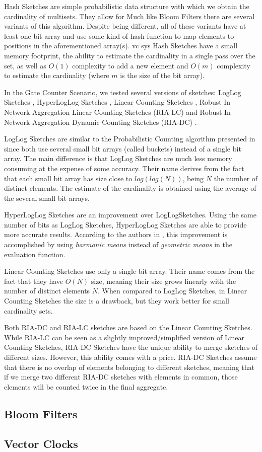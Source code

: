 Hash Sketches are simple probabilistic data structure with which we 
obtain the cardinality of multisets. They allow for 
Much like Bloom Filters there are several variants of this algorithm.
Despite being different, all of these variants have at least one bit array
and use some kind of hash function to map elements to positions in the
aforementioned array(s).
vc sys
Hash Sketches have a small memory footprint, the ability to estimate the
cardinality in a single pass over the set, as well as $O(1)$ complexity to
add a new element and $O(m)$ complexity to estimate the cardinality (where
$m$ is the size of the bit array).

In the Gate Counter Scenario, we tested several versions of sketches: LogLog
Sketches \cite{Durand:2003tc}, HyperLogLog Sketches \cite{Fusy:2007um}, Linear
Counting Sketches \cite{Whang:1990uh}, Robust In Network Aggregation Linear
Counting Sketches (RIA-LC) \cite{Fan:2008wl,YaoChungFanArbeeLPChen:2010to} and
Robust In Network Aggregation Dynamic Counting Sketches (RIA-DC)
\cite{YaoChungFanArbeeLPChen:2010to}.

LogLog Sketches are similar to the Probabilistic Counting algorithm
presented in \cite{Flajolet:1985wd} since both use several small bit arrays
(called buckets) instead of a single bit array. The main difference is that
LogLog Sketches are much less memory consuming at the expense of some
accuracy. Their name derives from the fact that each small bit array has
size close to $log(log(N))$, being $N$ the number of distinct elements. The
estimate of the cardinality is obtained using the average of the several
small bit arrays.

HyperLogLog Sketches are an improvement over LogLogSketches. Using the same
number of bits as LogLog Sketches, HyperLogLog Sketches are able to provide more
accurate results. According to the authors in \cite{Fusy:2007um}, this
improvement is accomplished by using \emph{harmonic means} instead of
\emph{geometric means} in the evaluation function.

Linear Counting Sketches use only a single bit array. Their name comes from the
fact that they have $O(N)$ size, meaning their size grows linearly with the
number of distinct elements $N$. When compared to LogLog Sketches, in Linear
Counting Sketches the size is a drawback, but they work better for small
cardinality sets.

Both RIA-DC and RIA-LC sketches are based on the Linear Counting
Sketches. While RIA-LC can be seen as a slightly improved/simplified version of
Linear Counting Sketches, RIA-DC Sketches have the unique ability to
merge sketches of different sizes. However, this ability comes with a
price. RIA-DC Sketches assume that there is no overlap of elements belonging to
different sketches, meaning that if we merge two different RIA-DC sketches with
elements in common, those elements will be counted twice in the final aggregate.

\subsection{Bloom Filters}
\label{sec:bloom_filters}


\subsection{Vector Clocks}
\label{sec:vector_clocks}

